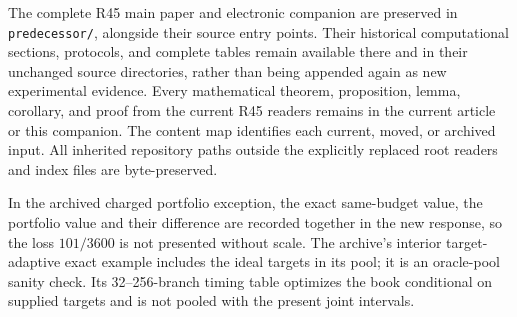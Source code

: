 The complete R45 main paper and electronic companion are preserved in \texttt{predecessor/}, alongside their source entry points. Their historical computational sections, protocols, and complete tables remain available there and in their unchanged source directories, rather than being appended again as new experimental evidence. Every mathematical theorem, proposition, lemma, corollary, and proof from the current R45 readers remains in the current article or this companion. The content map identifies each current, moved, or archived input. All inherited repository paths outside the explicitly replaced root readers and index files are byte-preserved.

In the archived charged portfolio exception, the exact same-budget value, the portfolio value and their difference are recorded together in the new response, so the loss $101/3600$ is not presented without scale. The archive's interior target-adaptive exact example includes the ideal targets in its pool; it is an oracle-pool sanity check. Its 32--256-branch timing table optimizes the book conditional on supplied targets and is not pooled with the present joint intervals.
